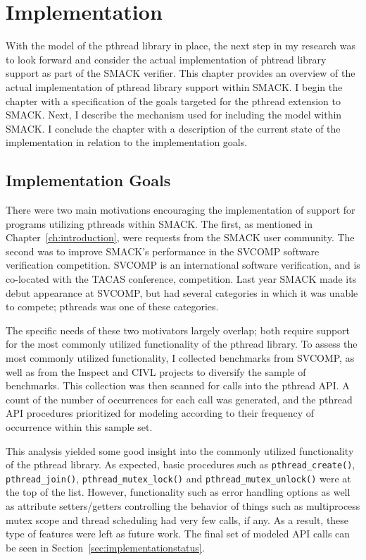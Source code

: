 \chapter{Implementation}\label{ch:implementation}
With the model of the pthread library in place, the next step in my
research was to look forward and consider the actual implementation of
phtread library support as part of the SMACK verifier.  This chapter
provides an overview of the actual implementation of pthread library
support within SMACK.  I begin the chapter with a specification of the
goals targeted for the pthread extension to SMACK.  Next, I describe
the mechanism used for including the model within SMACK.  \iffalse
[This is followed by a discussion of changes required in the SMACK
tool itself to support the new model.]\fi  I conclude the chapter with
a description of the current state of the implementation in relation
to the implementation goals. 

\section{Implementation Goals}\label{sec:implementationgoals}
There were two main motivations encouraging the implementation of
support for programs utilizing pthreads within SMACK.  The first, as
mentioned in Chapter~\ref{ch:introduction}, were requests from the
SMACK user community.  The second was to improve SMACK's performance
in the SVCOMP software verification competition.  SVCOMP is an
international software verification, and is co-located with the TACAS
conference, competition.  Last year SMACK made its debut appearance at
SVCOMP, but had several categories in which it was unable to compete;
pthreads was one of these categories.

The specific needs of these two motivators largely overlap; both
require support for the most commonly utilized functionality of the
pthread library.  To assess the most commonly utilized functionality,
I collected benchmarks from SVCOMP, as well as from the Inspect and
CIVL projects to diversify the sample of benchmarks.  This collection
was then scanned for calls into the pthread API.  A count of the
number of occurrences for each call was generated, and the pthread API
procedures prioritized for modeling according to their frequency of
occurrence within this sample set. 

This analysis yielded some good insight into the commonly utilized
functionality of the pthread library.  As expected, basic
procedures such as \lstinline[breaklines]|pthread_create()|,
\lstinline[breaklines]|pthread_join()|,
\lstinline[breaklines]|pthread_mutex_lock()| and 
\lstinline[breaklines]|pthread_mutex_unlock()| were at the top of the
list. However, functionality such as error handling options as well as
attribute setters/getters controlling the behavior of things such as
multiprocess mutex scope and thread scheduling had very few calls, if
any.  As a result, these type of features were left as future
work. The final set of modeled API calls can be seen in
Section~\ref{sec:implementationstatus}.  

